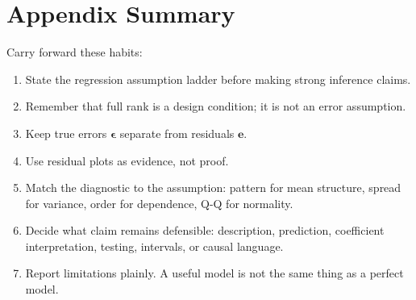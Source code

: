 \section{Appendix Summary}

Carry forward these habits:
\begin{enumerate}
  \item State the regression assumption ladder before making strong inference claims.
  \item Remember that full rank is a design condition; it is not an error assumption.
  \item Keep true errors \(\boldsymbol{\epsilon}\) separate from residuals \(\mathbf{e}\).
  \item Use residual plots as evidence, not proof.
  \item Match the diagnostic to the assumption: pattern for mean structure, spread for variance, order for dependence, Q-Q for normality.
  \item Decide what claim remains defensible: description, prediction, coefficient interpretation, testing, intervals, or causal language.
  \item Report limitations plainly.  A useful model is not the same thing as a perfect model.
\end{enumerate}
